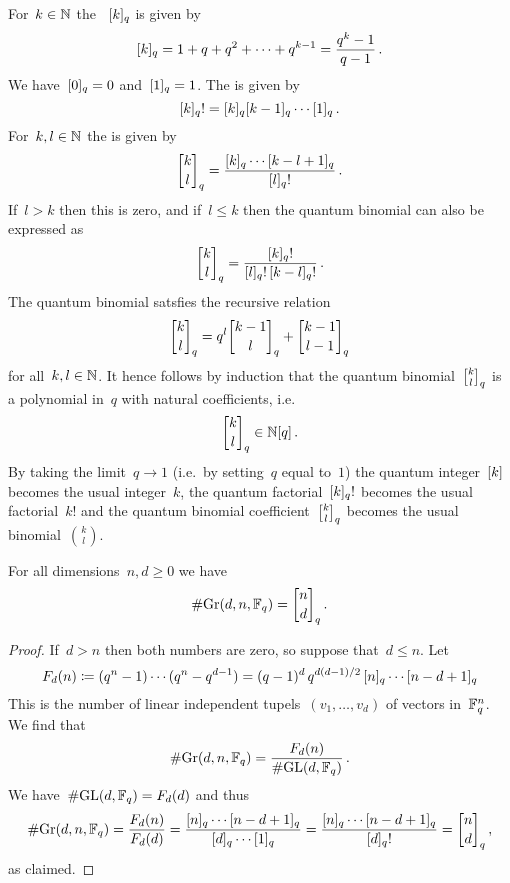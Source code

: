 \documentclass[a4paper,11pt]{scrartcl}
\begin{document}
\begin{recall}
  For~$k \in \mathbb{N}$ the ~$[k]_q$ is given by
  \[
    [k]_q
    =
    1 + q + q^2 + \dotsb + q^{k-1}
    =
    \frac{q^k - 1}{q - 1} \,.
  \]
  We have~$[0]_q = 0$ and~$[1]_q = 1$.
  The  is given by
  \[
    [k]_q !
    =
    [k]_q [k-1]_q \dotsm [1]_q \,.
  \]
  For~$k, l \in \mathbb{N}$ the  is given by
  \[
    \qbinomial{k}{l}_q
    =
    \frac{\qnum{k}_q \dotsm \qnum{k-l+1}_q}{\qnum{l}_q!} \,.
  \]
  If~$l > k$ then this is zero, and if~$l \leq k$ then the quantum binomial can also be expressed as
  \[
    \qbinomial{k}{l}_q
    =
    \frac{\qnum{k}_q!}{\qnum{l}_q! \, \qnum{k-l}_q!} \,.
  \]
  The quantum binomial satsfies the recursive relation
  \[
    \qbinomial{k}{l}_q
    =
    q^l \qbinomial{k-1}{l}_q
    +
    \qbinomial{k-1}{l-1}_q
  \]
  for all~$k, l \in \mathbb{N}$.
  It hence follows by induction that the quantum binomial~$\qbinomial{k}{l}_q$ is a polynomial in~$q$ with natural coefficients, i.e.
  \[
    \qbinomial{k}{l}_q
    \in
    \Natural[q] \,.
  \]
  By taking the limit~$q \to 1$ (i.e.\ by setting~$q$ equal to~$1$) the quantum integer~$[k]$ becomes the usual integer~$k$, the quantum factorial~$[k]_q!$ becomes the usual factorial~$k!$ and the quantum binomial coefficient~$\qbinomial{k}{l}_q$ becomes the usual binomial~$\binom{k}{l}$.
\end{recall}

\begin{lemma}
  For all dimensions~$n, d \geq 0$ we have
  \[
    \counting {\Gr(d, n, \Finite_q)}
    =
    \qbinomial{n}{d}_q \,.
  \]
\end{lemma}

\begin{proof}
  If~$d > n$ then both numbers are zero, so suppose that~$d \leq n$.  
  Let
  \[
    F_d(n)
    \coloneqq
    (q^n - 1) \dotsm (q^n - q^{d-1})
    =
    (q-1)^d \, q^{d(d-1)/2} \, [n]_q \dotsm [n-d+1]_q
  \]
  This is the number of linear independent tupels~$(v_1, \dotsc, v_d)$ of vectors in~$\mathbb{F}_q^n$.
  We find that
  \[
    \# {\operatorname{Gr}(d, n, \mathbb{F}_q)}
    =
    \frac{ F_d(n) }{ \# {\operatorname{GL}(d, \mathbb{F}_q)} } \,.
  \]
  We have~$\# {\operatorname{GL}(d, \mathbb{F}_q)} = F_d(d)$ and thus
  \[
    \counting {\Gr(d, n, \Finite_q)}
    =
    \frac{ F_d(n) }{ F_d(d) }
    =
    \frac{ \qnum{n}_q \dotsm \qnum{n-d+1}_q }{ \qnum{d}_q \dotsm  \qnum{1}_q }
    =
    \frac{ \qnum{n}_q \dotsm \qnum{n-d+1}_q }{ \qnum{d}_q! }
    =
    \qbinomial{n}{d}_q \,,
  \]
  as claimed.
\end{proof}
\end{document}
